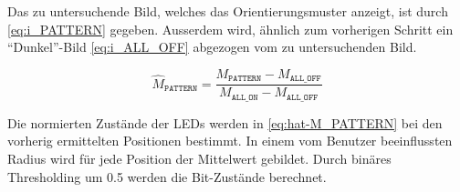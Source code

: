 



\label{sec:Interpretation-des-Orientierungsmuster} %

Das zu untersuchende Bild, welches das Orientierungsmuster anzeigt, ist durch \eqref{eq:i_PATTERN} gegeben.
Ausserdem wird, ähnlich zum vorherigen Schritt ein ``Dunkel''-Bild \eqref{eq:i_ALL_OFF} abgezogen vom zu untersuchenden Bild.

\begin{equation}\label{eq:hat-M_PATTERN}
  \widehat{M}_{\texttt{PATTERN}} = \frac{M_{\texttt{PATTERN}} - M_{\texttt{ALL\_OFF}} }{M_{\texttt{ALL\_ON}} - M_{\texttt{ALL\_OFF}} }
\end{equation}

Die normierten Zustände der LEDs werden in \eqref{eq:hat-M_PATTERN} bei den vorherig ermittelten Positionen bestimmt.
In einem vom Benutzer beeinflussten Radius wird für jede Position der Mittelwert gebildet.
Durch binäres Thresholding um 0.5 werden die Bit-Zustände berechnet.

